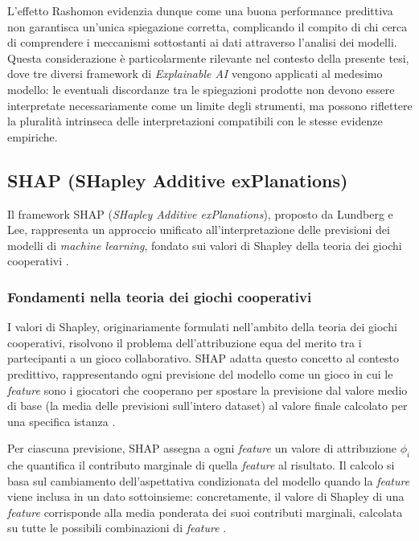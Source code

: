 L'effetto Rashomon evidenzia dunque come una buona performance predittiva non garantisca un'unica spiegazione corretta, complicando il compito di chi cerca di comprendere i meccanismi sottostanti ai dati attraverso l'analisi dei modelli. Questa considerazione è particolarmente rilevante nel contesto della presente tesi, dove tre diversi framework di \textit{Explainable AI} vengono applicati al medesimo modello: le eventuali discordanze tra le spiegazioni prodotte non devono essere interpretate necessariamente come un limite degli strumenti, ma possono riflettere la pluralità intrinseca delle interpretazioni compatibili con le stesse evidenze empiriche.

\subsection{SHAP (SHapley Additive exPlanations)}

Il framework SHAP (\textit{SHapley Additive exPlanations}), proposto da Lundberg e Lee, rappresenta un approccio unificato all'interpretazione delle previsioni dei modelli di \textit{machine learning}, fondato sui valori di Shapley della teoria dei giochi cooperativi \cite{lundberg2017unified}.

\subsubsection{Fondamenti nella teoria dei giochi cooperativi}

I valori di Shapley, originariamente formulati nell'ambito della teoria dei giochi cooperativi, risolvono il problema dell'attribuzione equa del merito tra i partecipanti a un gioco collaborativo. SHAP adatta questo concetto al contesto predittivo, rappresentando ogni previsione del modello come un gioco in cui le \textit{feature} sono i giocatori che cooperano per spostare la previsione dal valore medio di base (la media delle previsioni sull'intero dataset) al valore finale calcolato per una specifica istanza \cite{lundberg2017unified}.

Per ciascuna previsione, SHAP assegna a ogni \textit{feature} un valore di attribuzione $\phi_i$ che quantifica il contributo marginale di quella \textit{feature} al risultato. Il calcolo si basa sul cambiamento dell'aspettativa condizionata del modello quando la \textit{feature} viene inclusa in un dato sottoinsieme: concretamente, il valore di Shapley di una \textit{feature} corrisponde alla media ponderata dei suoi contributi marginali, calcolata su tutte le possibili combinazioni di \textit{feature} \cite{lundberg2017unified}.


